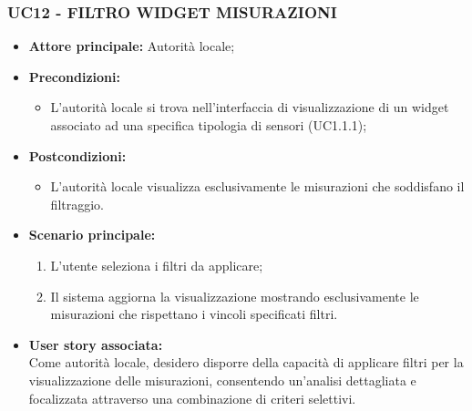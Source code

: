 \subsubsection{UC12 - FILTRO WIDGET MISURAZIONI}
\begin{itemize}
    \item \textbf{Attore principale:} Autorità locale;
    \item \textbf{Precondizioni:}
        \begin{itemize}
            \item L'autorità locale si trova nell'interfaccia di visualizzazione di un widget associato ad una specifica tipologia di sensori (UC1.1.1);
        \end{itemize}
    \item \textbf{Postcondizioni:}
          \begin{itemize}
              \item L'autorità locale visualizza esclusivamente le misurazioni che soddisfano il filtraggio.
          \end{itemize}
    \item \textbf{Scenario principale:}
          \begin{enumerate}
              \item L'utente seleziona i filtri da applicare;
              \item Il sistema aggiorna la visualizzazione mostrando esclusivamente le misurazioni che rispettano i vincoli specificati filtri.
          \end{enumerate}
    \item \textbf{User story associata:} \\
        Come autorità locale, desidero disporre della capacità di applicare filtri per la visualizzazione delle misurazioni, consentendo un'analisi dettagliata e focalizzata attraverso una combinazione di criteri selettivi.
\end{itemize}
